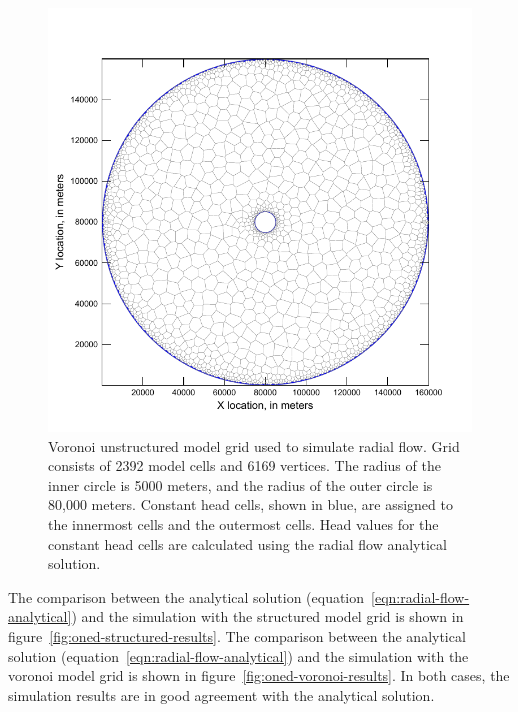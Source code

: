\documentclass[fleqn]{article}
\begin{document}
\begin{figure}[h!tbp]
	\centering
	\includegraphics[scale=0.70]{figures/oned-voronoi-grid.pdf}
	\caption[Voronoi unstructured model grid used to simulate radial flow.]{Voronoi unstructured model grid used to simulate radial flow.  Grid consists of 2392 model cells and 6169 vertices.  The radius of the inner circle is 5000 meters, and the radius of the outer circle is 80,000 meters.  Constant head cells, shown in blue, are assigned to the innermost cells and the outermost cells.  Head values for the constant head cells are calculated using the radial flow analytical solution.}
	\label{fig:oned-voronoi-grid}
\end{figure}

The comparison between the analytical solution (equation~\ref{eqn:radial-flow-analytical}) and the simulation with the structured model grid is shown in figure~\ref{fig:oned-structured-results}.  The comparison between the analytical solution (equation~\ref{eqn:radial-flow-analytical}) and the simulation with the voronoi model grid is shown in figure~\ref{fig:oned-voronoi-results}.  In both cases, the simulation results are in good agreement with the analytical solution.
\end{document}
